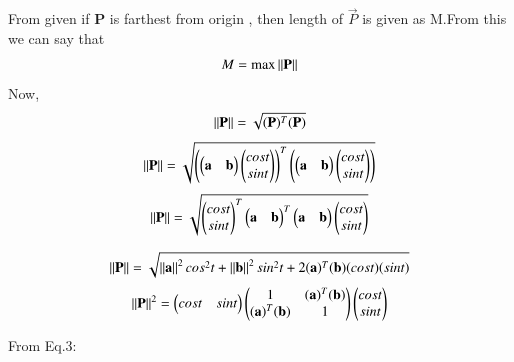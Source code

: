 \documentclass[journal]{IEEEtran}
\theoremstyle{remark}
\begin{document}
From given if \textbf{P} is farthest from origin , then length of $\vec{P}$ is given as M.From this we can say  that
\begin{align}
   M=\text{max}\norm{\Vec{P}}
\end{align}
Now,
\begin{align}
    \norm{\Vec{P}}=\sqrt{(\Vec{P})^T(\Vec{P})}
\end{align}
\begin{align}
    \norm{\Vec{P}}=\sqrt{\brak{\myvec{\vec{a}&\vec{b}}\myvec{cost\\sint}}^T\brak{\myvec{\vec{a}&\vec{b}}\myvec{cost\\sint}}}
\end{align}
\begin{align}
    \norm{\Vec{P}}=\sqrt{\myvec{cost\\sint}^T\myvec{\vec{a}&\vec{b}}
    ^T\myvec{\vec{a}&\vec{b}}\myvec{cost\\sint}}
\end{align}

\begin{align}
   \norm{\Vec{P}}=\sqrt{\norm{\Vec{a}}^2cos^2t+ \norm{\Vec{b}}^2sin^2t+2(\Vec{a})^T(\Vec{b})(cost)(sint)}
\end{align}
\begin{align}
       \norm{\Vec{P}}^2=\myvec{cost & sint}\myvec{1&(\Vec{a})^T(\Vec{b})\\(\Vec{a})^T(\Vec{b})&1}\myvec{cost\\sint}
\end{align}

From Eq.3:
\end{document}
